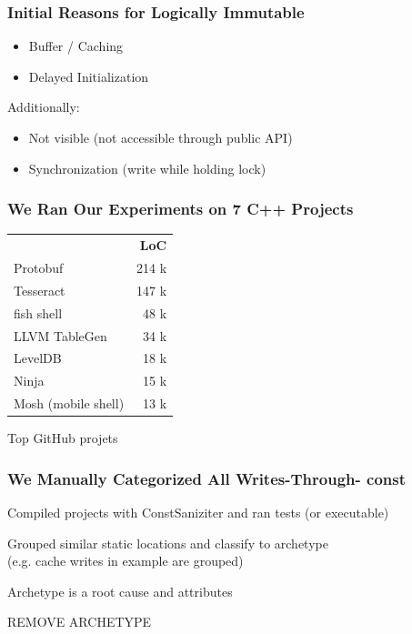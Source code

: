 \documentclass[aspectratio=169]{beamer}
\newcommand{\const}{{\color{blue} \bfseries \ttfamily const}}
\begin{document}
  \begin{frame}
    \frametitle{Initial Reasons for Logically Immutable}
    \Large
    \begin{itemize}
      \setlength\itemsep{0.5em}
      \item Buffer / Caching
      \item Delayed Initialization
    \end{itemize}

    \vspace{2em}
    Additionally:
    \vspace{0.25em}
    \begin{itemize}
      \setlength\itemsep{0.5em}
      \item Not visible (not accessible through public API)
      \item Synchronization (write while holding lock)
    \end{itemize}
  \end{frame}

  \begin{frame}
    \frametitle{We Ran Our Experiments on 7 C++ Projects}
    \Large
    \centering
    \begin{tabular}{l r}
      & \textbf{LoC} \\

      Protobuf & 214 k\\
      Tesseract & 147 k \\
      fish shell & 48 k \\
      LLVM TableGen & 34 k \\
      LevelDB & 18 k \\
      Ninja & 15 k \\
      Mosh (mobile shell) & 13 k \\
    \end{tabular}

    Top GitHub projets
  \end{frame}

  \begin{frame}
    \frametitle{We Manually Categorized All Writes-Through-\const{}}
    \Large
    Compiled projects with ConstSaniziter and ran tests (or executable)

    \vspace{1em}
    Grouped similar static locations and classify to archetype
    \\(e.g. cache writes in example are grouped)

    \vspace{1em}
    Archetype is a root cause and attributes

REMOVE ARCHETYPE
  \end{frame}
\end{document}
